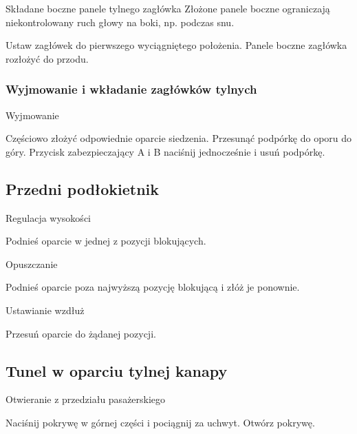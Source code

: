 Składane boczne panele tylnego zagłówka
Złożone panele boczne ograniczają niekontrolowany ruch głowy na boki, np. podczas snu.
\begin{itemizeArrow}
	\itemArrow Ustaw zagłówek do pierwszego wyciągniętego położenia.
	\itemArrow Panele boczne zagłówka rozłożyć do przodu.
\end{itemizeArrow}

\subsubsection{Wyjmowanie i wkładanie zagłówków tylnych}

Wyjmowanie
\begin{itemizeArrow}
	\itemArrow Częściowo złożyć odpowiednie oparcie siedzenia.
	\itemArrow Przesunąć podpórkę do oporu do góry.
	\itemArrow Przycisk zabezpieczający A i B naciśnij jednocześnie i usuń podpórkę.
\end{itemizeArrow}

\subsection{Przedni podłokietnik}


Regulacja wysokości
\begin{itemizeArrow}
	\itemArrow Podnieś oparcie w jednej z pozycji blokujących.
\end{itemizeArrow}

Opuszczanie

\begin{itemizeArrow}
	\itemArrow Podnieś oparcie poza najwyższą pozycję blokującą i złóż je ponownie.
\end{itemizeArrow}

Ustawianie wzdłuż
\begin{itemizeArrow}
	\itemArrow Przesuń oparcie do żądanej pozycji.
\end{itemizeArrow}

\subsection{Tunel w oparciu tylnej kanapy}

Otwieranie z przedziału pasażerskiego
\begin{itemizeArrow}
	\itemArrow Naciśnij pokrywę w górnej części i pociągnij za uchwyt.
	\itemArrow Otwórz pokrywę.
\end{itemizeArrow}

